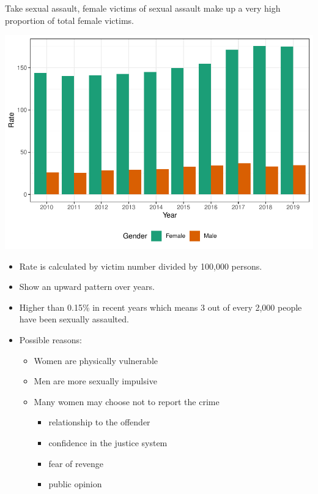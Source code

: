 \documentclass[11pt,a4paper,]{article}
\providecommand{\tightlist}{%
  \setlength{\itemsep}{0pt}\setlength{\parskip}{0pt}}
\begin{document}
Take sexual assault, female victims of sexual assault make up a very high proportion of total female victims.

\includegraphics{report_files/figure-latex/unnamed-chunk-9-1.pdf}

\begin{itemize}
\tightlist
\item
  Rate is calculated by victim number divided by 100,000 persons.
\item
  Show an upward pattern over years.
\item
  Higher than 0.15\% in recent years which means 3 out of every 2,000 people have been sexually assaulted.
\item
  Possible reasons:

  \begin{itemize}
  \tightlist
  \item
    Women are physically vulnerable
  \item
    Men are more sexually impulsive
  \item
    Many women may choose not to report the crime

    \begin{itemize}
    \tightlist
    \item
      relationship to the offender
    \item
      confidence in the justice system
    \item
      fear of revenge
    \item
      public opinion
    \end{itemize}
  \end{itemize}
\end{itemize}
\end{document}
